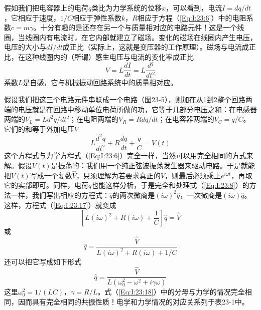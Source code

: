 假如我们把电容器上的电荷$q$类比为力学系统的位移$x$，可以看到，电流$I=dq/dt$，它相应于速度，$1/C$相应于弹性系数$k$，$R$相应于方程（\ref{Eq:I:23:6}）中的电阻系数$c=m\gamma$。十分有趣的是还存在另一个与质量相对应的电路元件！这是一个线圈，当线圈内有电流时，在它内部就建立了磁场。变化的磁场在线圈内产生电压，电压的大小与$dI/dt$成正比（实际上，这就是变压器的工作原理）。磁场与电流成正比，在这种线圈内的（所谓）感生电压与电流的变化率成正比
\begin{equation}
    \label{Eq:I:23:16}
    V=L\frac{dI}{dt}=L\frac{d^q}{dt^2}
\end{equation}
系数$L$是自感，它与机械振动回路系统中的质量相对应。

假设我们把这三个电路元件串联成一个电路（图23-5），则加在从1到2整个回路两端的电压就是在回路中移动单位电荷所做的功，它等于几部分电压之和：在电感器两端的$V_L=Ld^2q/dt^2$；在电阻两端的$V_R=Rdq/dt$；在电容器两端的$V_C=q/C$。它们的和等于外加电压$V$
\begin{equation}
    \label{Eq:I:23:17}
    L\frac{d^2q}{dt^2}+R\frac{dq}{dt}+\frac{q}{C}=V(t)
\end{equation}
这个方程式与力学方程式（\ref{Eq:I:23:6}）完全一样，当然可以用完全相同的方式来解。假设$V(t)$是振荡的：我们用一个纯正弦波振荡发生器来驱动电路。于是就能把$V(t)$写成一个复数$\hat{V}$，只须理解为若要求真正的$V$，则最后必须乘上$e^{i\omega t}$，再取它的实部即可。同样，电荷$q$也能这样分析，于是完全和处理式（\ref{Eq:I:23:8}）的方法一样，我们写出相应的方程式：$\hat{q}$的两次微商是$(i\omega)^2\hat{q}$，一次微商是$(i\omega)\hat{q}$。这样，方程式（\ref{Eq:I:23:17}）就变成
\begin{equation*}
    \left [ L(i\omega)^2+R(i\omega) +\frac{1}{C} \right ]\hat{q} = \hat{V}
\end{equation*}
或
\begin{equation*}
    \hat{q} = \frac{\hat{V}}{L(i\omega)^2+R(i\omega)+1/C}
\end{equation*}
还可以把它写成如下形式
\begin{equation}
    \label{Eq:I:23:18}
    \hat{q}=\frac{\hat{V}}{L(\omega_0^2-\omega^2+i\gamma\omega)}
\end{equation}
这里$\omega_0^2=1/(LC)$，$\gamma=R/L$。式（\ref{Eq:I:23:18}）中的分母与力学的情况完全相同，因而具有完全相同的共振性质！电学和力学情况的对应关系列于表23-1中。

